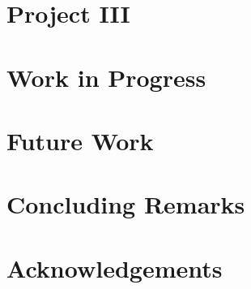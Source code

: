 \documentclass[]{scrbook}
\begin{document}
\chapter{Project III}

\chapter{Work in Progress}

\chapter{Future Work}

\chapter{Concluding Remarks}


\backmatter

\chapter{Acknowledgements}
\printbibliography
\end{document}
